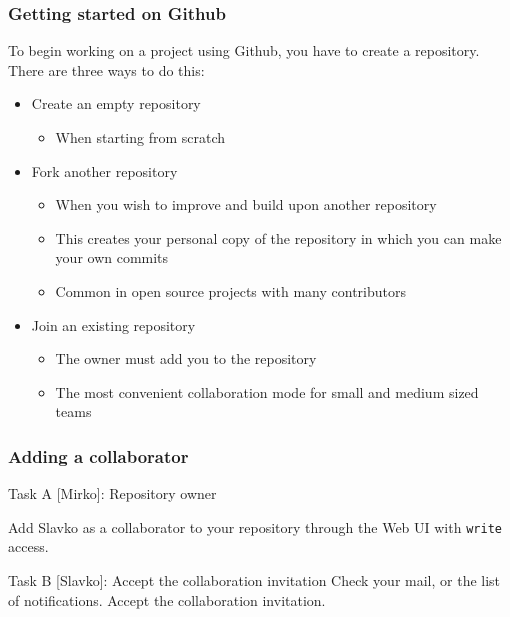 \begin{frame}

\frametitle{Getting started on Github}

To begin working on a project using Github, you have to create a repository. There are three ways to do this:


\begin{itemize}
	\item Create an empty repository
	\begin{itemize}
	\item When starting from scratch
	\end{itemize}	
	
	\medskip
	\item Fork another repository
	\begin{itemize}
	\item When you wish to improve and build upon another repository
	\item This creates your personal copy of the repository in which you can make your own commits
	\item Common in open source projects with many contributors
	\end{itemize}
	
	\medskip
	\item Join an existing repository
	\begin{itemize}
	\item The owner must add you to the repository
	\item The most convenient collaboration mode for small and medium sized teams
	\end{itemize}
\end{itemize}

\end{frame}


\begin{frame}[fragile]

\frametitle{Adding a collaborator}

\begin{block}{Task A [Mirko]: Repository owner}

	Add Slavko as a collaborator to your repository through the Web UI with \texttt{write} access.
\end{block}

\begin{block}{Task B [Slavko]: Accept the collaboration invitation}
Check your mail, or the list of notifications. Accept the collaboration invitation.
\end{block}

\end{frame}

